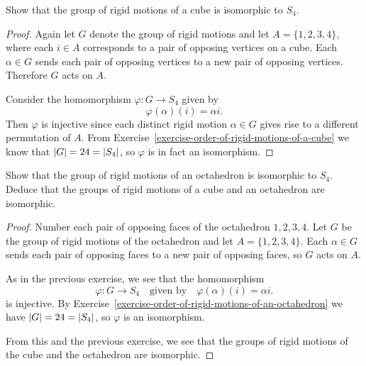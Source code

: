  Show that the group of rigid motions of a cube is
isomorphic to $S_4$.
\begin{proof}
  Again let $G$ denote the group of rigid motions and let
  $A = \{1,2,3,4\}$, where each $i\in A$ corresponds to a pair of
  opposing vertices on a cube. Each $\alpha\in G$ sends each pair of
  opposing vertices to a new pair of opposing vertices. Therefore $G$
  acts on $A$.

  Consider the homomorphism $\varphi\colon G\to S_4$ given by
  \begin{equation*}
    \varphi(\alpha)(i) = \alpha i.
  \end{equation*}
  Then $\varphi$ is injective since each distinct rigid motion
  $\alpha\in G$ gives rise to a different permutation of $A$. From
  Exercise~\ref{exercise-order-of-rigid-motions-of-a-cube} we know
  that $\lvert{G}\rvert = 24 = \lvert{S_4}\rvert$, so $\varphi$ is in fact an
  isomorphism.
\end{proof}

 Show that the group of rigid motions of an octahedron is
isomorphic to $S_4$. Deduce that the groups of rigid motions of a cube
and an octahedron are isomorphic.
\begin{proof}
  Number each pair of opposing faces of the octahedron $1,2,3,4$. Let
  $G$ be the group of rigid motions of the octahedron and let
  $A = \{1,2,3,4\}$. Each $\alpha\in G$ sends each pair of opposing
  faces to a new pair of opposing faces, so $G$ acts on $A$.

  As in the previous exercise, we see that the homomorphism
  \begin{equation*}
    \varphi\colon G\to S_4
    \quad\text{given by}\quad
    \varphi(\alpha)(i) = \alpha i.
  \end{equation*}
  is injective. By
  Exercise~\ref{exercise-order-of-rigid-motions-of-an-octahedron} we
  have $\lvert{G}\rvert = 24 = \lvert{S_4}\rvert$, so $\varphi$ is an isomorphism.

  From this and the previous exercise, we see that the groups of rigid
  motions of the cube and the octahedron are isomorphic.
\end{proof}
